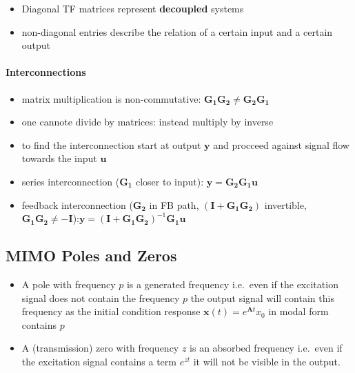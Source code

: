 \begin{itemize}
    \item Diagonal TF matrices represent \textbf{decoupled} systems
    \item non-diagonal entries describe the relation of a certain input and a certain output
\end{itemize}

\paragraph{Interconnections}

\begin{itemize}
    \item matrix multiplication is non-commutative: $\mathbf{G_1G_2} \ne \mathbf{G_2G_1}$
    \item one cannote divide by matrices: instead multiply by inverse
    \item to find the interconnection start at output $\mathbf{y}$ and procceed against signal flow towards the input $\mathbf{u}$
    \item series interconnection ($\mathbf{G_1}$ closer to input): $\mathbf{y}=\mathbf{G_2G_1u}$
    \item feedback interconnection ($\mathbf{G_2}$ in FB path, $(\mathbf{I}+\mathbf{G_1G_2})$ invertible, $\mathbf{G_1G_2}\ne -\mathbf{I}$):\newline $\mathbf{y}={(\mathbf{I}+\mathbf{G_1G_2})}^{-1}\mathbf{G_1u}$
\end{itemize}
\subsection{MIMO Poles and Zeros}


\begin{itemize}
    \item A pole with frequency $p$ is a generated frequency i.e.\ even if the excitation signal does not contain the frequency $p$ the output signal will contain this frequency as the initial condition response $\mathbf{x}(t)=e^{\mathbf{A}t}x_0$ in modal form contains $p$
    \item A (transmission) zero with frequency $z$ is an absorbed frequency i.e.\ even if the excitation signal contains a term $e^{zt}$ it will not be visible in the output.
\end{itemize}

